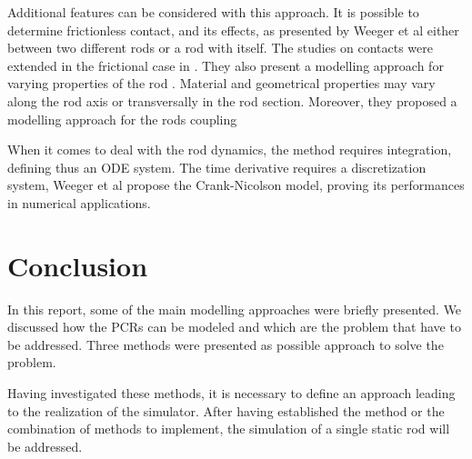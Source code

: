\documentclass{thesisreport}
\begin{document}
 Additional features can be considered with this approach. It is possible to determine frictionless contact, and its effects, as presented by Weeger et al\cite{weeger_isogeometric_2017} either between two different rods or a rod with itself. The studies on contacts were extended in the frictional case in \cite{weeger_isogeometric_2018}. They also present a modelling approach for varying properties of the rod \cite{weeger_fully_2018}. Material and geometrical properties may vary along the rod axis or transversally in the rod section. Moreover, they proposed a modelling approach for the rods coupling \cite{weeger_isogeometric_2017-1}
 
 When it comes to deal with the rod dynamics, the method requires integration, defining thus an ODE system. The time derivative requires a discretization system, Weeger et al \cite{weeger_isogeometric_2018} propose the Crank-Nicolson model, proving its performances in numerical applications. 


 \chapter*{Conclusion}
 
 In this report, some of the main modelling approaches were briefly presented. We discussed how the PCRs can be modeled and which are the problem that have to be addressed. Three methods were presented as possible approach to solve the problem. 
 
 
 Having investigated these methods, it is necessary to define an approach leading to the realization of the simulator. After having established the method or the combination of methods to implement, the simulation of a single static rod will be addressed. 
 
 

 
 
 
 
 
 
\end{document}
